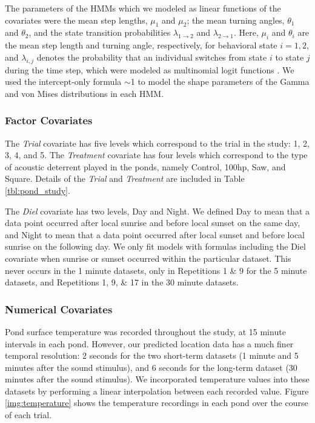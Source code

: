 \documentclass[12pt]{article}
\begin{document}
	The parameters of the HMMs which we modeled as linear functions of the covariates were the mean step lengths, $\mu_1$ and $\mu_2$; the mean turning angles, $\theta_1$ and $\theta_2$, and the state transition probabilities $\lambda_{1 \to 2}$ and $\lambda_{2 \to 1}$. Here, $\mu_i$ and $\theta_i$ are the mean step length and turning angle, respectively, for behavioral state $i = 1, 2$, and $\lambda_{i, j}$ denotes the probability that an individual switches from state $i$ to state $j$ during the time step, which were modeled as multinomial logit functions \cite{Michelot2016}. We used the intercept-only formula $\sim$1 to model the shape parameters of the Gamma and von Mises distributions in each HMM.
	
	\subsubsection{Factor Covariates}
	
	The \emph{Trial} covariate has five levels which correspond to the trial in the study: 1, 2, 3, 4, and 5. The \emph{Treatment} covariate has four levels which correspond to the type of acoustic deterrent played in the ponds, namely Control, 100hp, Saw, and Square. Details of the \emph{Trial} and \emph{Treatment} are included in Table \ref{tbl:pond_study}.
	
	The \emph{Diel} covariate has two levels, Day and Night. We defined Day to mean that a data point occurred after local sunrise and before local sunset on the same day, and Night to mean that a data point occurred after local sunset and before local sunrise on the following day. We only fit models with formulas including the Diel covariate when sunrise or sunset occurred within the particular dataset. This never occurs in the 1 minute datasets, only in Repetitions 1 \& 9 for the 5 minute datasets, and Repetitions 1, 9, \& 17 in the 30 minute datasets.
	
	\subsubsection{Numerical Covariates} \label{sec:num-cov}
	
	Pond surface temperature was recorded throughout the study, at 15 minute intervals in each pond. However, our predicted location data has a much finer temporal resolution: 2 seconds for the two short-term datasets (1 minute and 5 minutes after the sound stimulus), and 6 seconds for the long-term dataset (30 minutes after the sound stimulus). We incorporated temperature values into these datasets by performing a linear interpolation between each recorded value. Figure \ref{img:temperature} shows the temperature recordings in each pond over the course of each trial.
	
\end{document}
